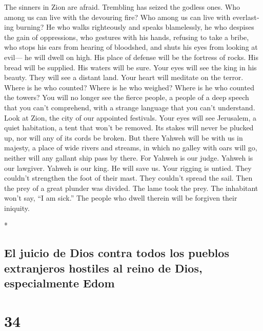 \begin{paracol}{2}
\begin{otherlanguage}{english}
 The sinners in Zion are afraid. Trembling has seized the
godless ones. Who among us can live with the devouring fire? Who among
us can live with everlasting burning?  He who walks
righteously and speaks blamelessly, he who despises the gain of
oppressions, who gestures with his hands, refusing to take a bribe, who
stops his ears from hearing of bloodshed, and shuts his eyes from
looking at evil---  he will dwell on high. His place of
defense will be the fortress of rocks. His bread will be supplied. His
waters will be sure.  Your eyes will see the king in his
beauty. They will see a distant land.  Your heart will
meditate on the terror. Where is he who counted? Where is he who
weighed? Where is he who counted the towers?  You will no
longer see the fierce people, a people of a deep speech that you can't
comprehend, with a strange language that you can't understand.
 Look at Zion, the city of our appointed festivals. Your
eyes will see Jerusalem, a quiet habitation, a tent that won't be
removed. Its stakes will never be plucked up, nor will any of its cords
be broken.  But there Yahweh will be with us in majesty,
a place of wide rivers and streams, in which no galley with oars will
go, neither will any gallant ship pass by there.  For
Yahweh is our judge. Yahweh is our lawgiver. Yahweh is our king. He will
save us.  Your rigging is untied. They couldn't
strengthen the foot of their mast. They couldn't spread the sail. Then
the prey of a great plunder was divided. The lame took the prey.
 The inhabitant won't say, ``I am sick.'' The people who
dwell therein will be forgiven their iniquity.

\end{otherlanguage}

\switchcolumn[0]*

\hypertarget{el-juicio-de-dios-contra-todos-los-pueblos-extranjeros-hostiles-al-reino-de-dios-especialmente-edom}{%
\subsection{El juicio de Dios contra todos los pueblos extranjeros
hostiles al reino de Dios, especialmente
Edom}\label{el-juicio-de-dios-contra-todos-los-pueblos-extranjeros-hostiles-al-reino-de-dios-especialmente-edom}}

\hypertarget{section-66}{%
\section{34}\label{section-66}}


\end{paracol}
